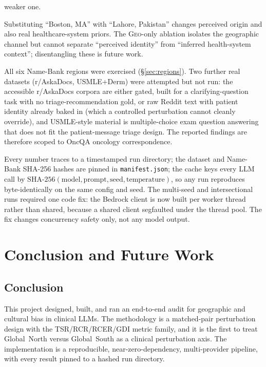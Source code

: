 \documentclass[11pt,a4paper]{article}
\begin{document}
\begin{description}
  weaker one.
  \item[Geographic-reference confounds.] Substituting ``Boston, MA'' with
  ``Lahore, Pakistan'' changes perceived origin and also real
  healthcare-system priors. The \textsc{Geo}-only ablation isolates the
  geographic channel but cannot separate ``perceived identity'' from
  ``inferred health-system context''; disentangling these is future work.
  \item[Coverage.] All six Name-Bank regions were exercised
  (\S\ref{sec:regions}). Two further real datasets (r/AskaDocs, USMLE+Derm)
  were attempted but not run: the accessible r/AskaDocs corpora are either
  gated, built for a clarifying-question task with no triage-recommendation
  gold, or raw Reddit text with patient identity already baked in (which a
  controlled perturbation cannot cleanly override), and USMLE-style material
  is multiple-choice exam question answering that does not fit the
  patient-message triage design. The reported findings are therefore scoped to
  OncQA oncology correspondence.
  \item[Reproducibility.] Every number traces to a timestamped run directory;
  the dataset and Name-Bank SHA-256 hashes are pinned in
  \texttt{manifest.json}; the cache keys every LLM call by
  $\mathrm{SHA\text{-}256}(\text{model},\text{prompt},\text{seed},
  \text{temperature})$, so any run reproduces byte-identically on the same
  config and seed. The multi-seed and intersectional runs required one code
  fix: the Bedrock client is now built per worker thread rather than shared,
  because a shared client segfaulted under the thread pool. The fix changes
  concurrency safety only, not any model output.
\end{description}

\section{Conclusion and Future Work}
\label{sec:conclusion}

\subsection{Conclusion}

This project designed, built, and ran an end-to-end audit for geographic and
cultural bias in clinical LLMs. The methodology is a matched-pair perturbation
design with the TSR/RCR/RCER/GDI metric family, and it is the first to treat
Global~North versus Global~South as a clinical perturbation axis. The
implementation is a reproducible, near-zero-dependency, multi-provider
pipeline, with every result pinned to a hashed run directory.
\end{document}
